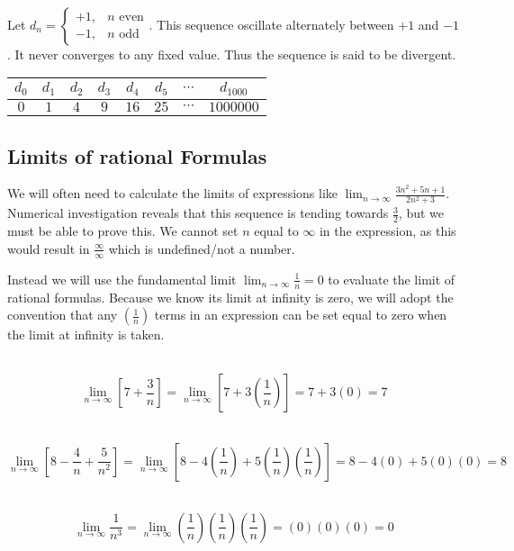 \\
Let $d_n=\begin{cases} +1, & n \text{ even} \\ -1, & n \text{ odd} \end{cases}$. This sequence oscillate alternately between $+1$ and $-1$. It never converges to any fixed value. Thus the sequence is said to be divergent.
\begin{center}
\begin{tabular}{|c|c|c|c|c|c||c|c|}
\hline
$d_0$ & $d_1$ & $d_2$ & $d_3$ & $d_4$ & $d_5$ & $\cdots$ & $d_{1000}$  \\
\hline
$0$ & $1$ & $4$ & $9$ & $16$ & $25$ & $\cdots$ & $1000000$ \\
\hline
\end{tabular}
\end{center}
\pagebreak
\subsection*{Limits of rational Formulas}

We will often need to calculate the limits of expressions like $\lim_{n\to \infty} \frac{3 n^2 + 5n +1}{2 n^2 +3}$. Numerical investigation reveals that this sequence is tending towards $\frac{3}{2}$, but we must be able to prove this. We cannot set $n$ equal to $\infty$ in the expression, as this would result in $\frac{\infty}{\infty}$ which is undefined/not a number.

Instead we will use the fundamental limit $\lim_{ n \to \infty} \frac{1}{n}=0$ to evaluate the limit of rational formulas. Because we know its limit at infinity is zero, we will adopt the convention that any $\left( \frac{1}{n}\right)$ terms in an expression can be set equal to zero when the limit at infinity is taken.

\\
\[ \lim_{n \to \infty} \left[ 7+\frac{3}{n} \right] =  \lim_{n \to \infty} \left[ 7+ 3 \left( \frac{1}{n} \right) \right] = 7+ 3(0) = 7\]

\\
\[ \lim_{n \to \infty} \left[ 8-\frac{4}{n}+\frac{5}{n^2} \right] =  \lim_{n \to \infty} \left[ 8-4 \left( \frac{1}{n} \right) + 5 \left( \frac{1}{n} \right) \left( \frac{1}{n} \right) \right] = 8-4(0)+5(0)(0) = 8\]

\\
\[
\lim_{n \to \infty } \frac{1}{n^3}= \lim_{n \to \infty } \left( \frac{1}{n} \right)\left( \frac{1}{n} \right)\left( \frac{1}{n} \right) = (0)(0)(0) = 0
\]

